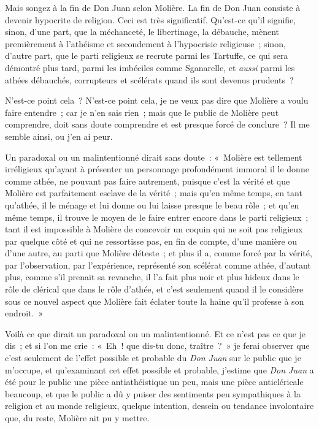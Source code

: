 \documentclass[french,twoside]{book} %
\begin{document}
 Mais songez à la fin de Don Juan selon Molière. La fin de Don Juan consiste à devenir hypocrite de religion. Ceci est très significatif. Qu’est-ce qu’il signifie, sinon, d’une part, que la méchanceté, le libertinage, la débauche, mènent premièrement à l’athéisme et secondement à l’hypocrisie religieuse ; sinon, d’autre part, que le parti religieux se recrute parmi les Tartuffe, ce qui sera démontré plus tard, parmi les imbéciles comme Sganarelle, et {\itshape aussi} parmi les athées débauchés, corrupteurs et scélérats quand ils sont devenus prudents ?\par
N’est-ce point cela ? N’est-ce point cela, je ne veux pas dire que Molière a voulu faire entendre ; car je n’en sais rien ; mais que le public de Molière peut comprendre, doit sans doute comprendre et est presque forcé de conclure ? Il me semble ainsi, ou j’en ai peur.\par
Un paradoxal ou un malintentionné dirait sans doute : « Molière est tellement irréligieux qu’ayant à présenter un personnage profondément immoral il le donne comme athée, ne pouvant pas faire autrement, puisque c’est la vérité et que Molière est parfaitement esclave de la vérité ; mais qu’en même temps, en tant qu’athée, il le ménage et lui donne ou lui laisse presque le beau rôle ; et qu’en même temps, il trouve le moyen de le faire entrer encore dans le parti religieux ; tant il est impossible  à Molière de concevoir un coquin qui ne soit pas religieux par quelque côté et qui ne ressortisse pas, en fin de compte, d’une manière ou d’une autre, au parti que Molière déteste ; et plus il a, comme forcé par la vérité, par l’observation, par l’expérience, représenté son scélérat comme athée, d’autant plus, comme s’il prenait sa revanche, il l’a fait plus noir et plus hideux dans le rôle de clérical que dans le rôle d’athée, et c’est seulement quand il le considère sous ce nouvel aspect que Molière fait éclater toute la haine qu’il professe à son endroit. »\par
Voilà ce que dirait un paradoxal ou un malintentionné. Et ce n’est pas ce que je dis ; et si l’on me crie : « Eh ! que dis-tu donc, traître ? » je ferai observer que c’est seulement de l’effet possible et probable du \emph{Don Juan} sur le public que je m’occupe, et qu’examinant cet effet possible et probable, j’estime que \emph{Don Juan} a été pour le public une pièce antiathéistique un peu, mais une pièce anticléricale beaucoup, et que le public a dû y puiser des sentiments peu sympathiques à la religion et au monde religieux, quelque intention, dessein ou tendance involontaire que, du reste, Molière ait pu y mettre.\par
\end{document}
